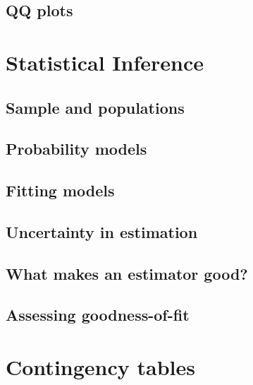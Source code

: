 \documentclass[
  british,
]{book}
\begin{document}
\hypertarget{qq-plots}{%
\section{QQ plots}\label{qq-plots}}

\hypertarget{statistical-inference}{%
\chapter{Statistical Inference}\label{statistical-inference}}

\hypertarget{sample-and-populations}{%
\section{Sample and populations}\label{sample-and-populations}}

\hypertarget{probability-models}{%
\section{Probability models}\label{probability-models}}

\hypertarget{fitting-models}{%
\section{Fitting models}\label{fitting-models}}

\hypertarget{uncertainty-in-estimation}{%
\section{Uncertainty in estimation}\label{uncertainty-in-estimation}}

\hypertarget{good}{%
\section{What makes an estimator good?}\label{good}}

\hypertarget{assessing-goodness-of-fit}{%
\section{Assessing goodness-of-fit}\label{assessing-goodness-of-fit}}

\hypertarget{contingency}{%
\chapter{Contingency tables}\label{contingency}}
\end{document}
